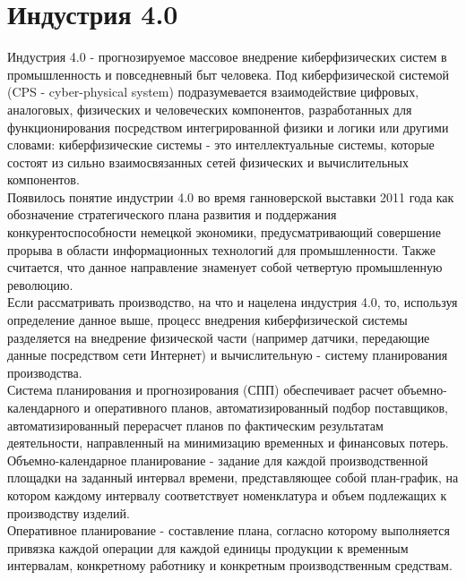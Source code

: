 \section{Индустрия 4.0}
Индустрия 4.0 - прогнозируемое массовое внедрение киберфизических систем в промышленность и повседневный быт человека.
Под киберфизической системой (CPS - cyber-physical system) подразумевается взаимодействие цифровых, аналоговых, физических и человеческих компонентов, разработанных для функционирования посредством интегрированной физики и логики или другими словами: киберфизические системы - это интеллектуальные системы, которые состоят из сильно взаимосвязанных сетей физических и вычислительных компонентов.\cite{nist}\\
\indent Появилось понятие индустрии 4.0 во время ганноверской выставки 2011 года как обозначение стратегического плана развития и поддержания конкурентоспособности немецкой экономики, предусматривающий совершение прорыва в области информационных технологий для промышленности.
Также считается, что данное направление знаменует собой четвертую промышленную революцию.\cite{industry}\\
\indent Если рассматривать производство, на что и нацелена индустрия 4.0, то, используя определение данное выше, процесс внедрения киберфизической системы разделяется на внедрение физической части (например датчики, передающие данные посредством сети Интернет) и вычислительную - систему планирования производства.\\
\indent Система планирования и прогнозирования (СПП) обеспечивает расчет объемно-календарного и оперативного планов, автоматизированный подбор поставщиков, автоматизированный перерасчет планов по фактическим результатам деятельности, направленный на минимизацию временных и финансовых потерь.\\
\indent Объемно-календарное планирование - задание для каждой производственной площадки на заданный интервал времени, представляющее собой план-график, на котором каждому интервалу соответствует номенклатура и объем подлежащих к производству изделий.\cite{niokr}\\
\indent Оперативное планирование - составление плана, согласно которому выполняется привязка каждой операции для каждой единицы продукции к временным интервалам, конкретному работнику и конкретным производственным средствам.\cite{niokr}\\
